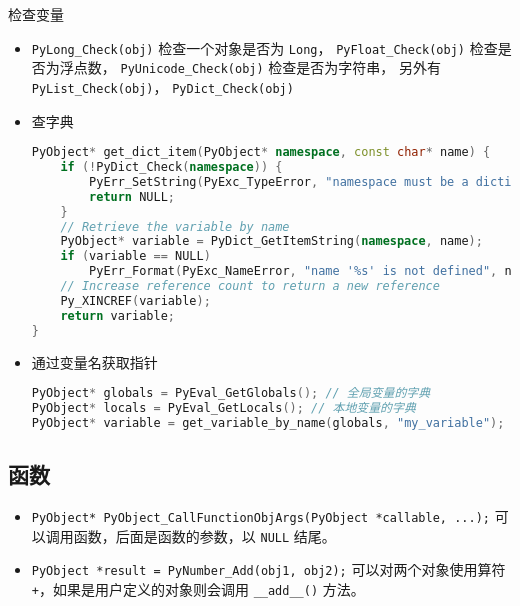 检查变量
\begin{itemize}
\item \verb`PyLong_Check(obj)` 检查一个对象是否为 \verb`Long`， \verb`PyFloat_Check(obj)` 检查是否为浮点数， \verb`PyUnicode_Check(obj)` 检查是否为字符串， 另外有 \verb`PyList_Check(obj)`， \verb`PyDict_Check(obj)`
\item 查字典
\begin{lstlisting}[language=cpp]
PyObject* get_dict_item(PyObject* namespace, const char* name) {
    if (!PyDict_Check(namespace)) {
        PyErr_SetString(PyExc_TypeError, "namespace must be a dictionary");
        return NULL;
    }
    // Retrieve the variable by name
    PyObject* variable = PyDict_GetItemString(namespace, name);
    if (variable == NULL)
        PyErr_Format(PyExc_NameError, "name '%s' is not defined", name);
    // Increase reference count to return a new reference
    Py_XINCREF(variable);
    return variable;
}
\end{lstlisting}
\item 通过变量名获取指针
\begin{lstlisting}[language=cpp]
PyObject* globals = PyEval_GetGlobals(); // 全局变量的字典
PyObject* locals = PyEval_GetLocals(); // 本地变量的字典
PyObject* variable = get_variable_by_name(globals, "my_variable");
\end{lstlisting}
\end{itemize}


\subsection{函数}
\begin{itemize}
\item \verb`PyObject* PyObject_CallFunctionObjArgs(PyObject *callable, ...);` 可以调用函数，后面是函数的参数，以 \verb`NULL` 结尾。
\item \verb`PyObject *result = PyNumber_Add(obj1, obj2);` 可以对两个对象使用算符 \verb`+`，如果是用户定义的对象则会调用 \verb`__add__()` 方法。
\end{itemize}
